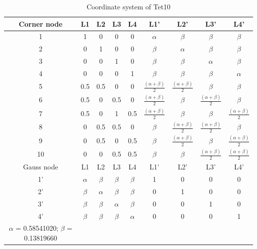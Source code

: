 \begin{table}
	\centering
	\caption{Coordinate system of Tet10} \label{tab: Tet10}
	\begin{tabular}{ccccccccc}			
		\hline
		Corner node\centering& L1& L2& L3& L4& L1'& L2'& L3'& L4'\\ \hline
		1\centering& 1& 0& 0& 0& $\alpha$& $\beta$& $\beta$& $\beta$\\
		2\centering& 0& 1& 0& 0& $\beta$& $\alpha$& $\beta$& $\beta$\\
		3\centering& 0& 0& 1& 0& $\beta$& $\beta$& $\alpha$& $\beta$\\
		4\centering& 0& 0& 0& 1& $\beta$& $\beta$& $\beta$& $\alpha$\\
		5\centering& 0.5& 0.5& 0& 0& $\frac{(\alpha+\beta)}{2}$& $\frac{(\alpha+\beta)}{2}$& $\beta$& $\beta$\\
		6\centering& 0.5& 0& 0.5& 0& $\frac{(\alpha+\beta)}{2}$& $\beta$& $\frac{(\alpha+\beta)}{2}$& $\beta$\\
		7\centering& 0.5& 0& 1& 0.5& $\frac{(\alpha+\beta)}{2}$& $\beta$& $\beta$& $\frac{(\alpha+\beta)}{2}$\\
		8\centering& 0& 0.5& 0.5& 0& $\beta$& $\frac{(\alpha+\beta)}{2}$& $\frac{(\alpha+\beta)}{2}$& $\beta$\\
		9\centering& 0& 0.5& 0& 0.5& $\beta$& $\frac{(\alpha+\beta)}{2}$& $\beta$& $\frac{(\alpha+\beta)}{2}$\\
		10\centering& 0& 0& 0.5& 0.5& $\beta$& $\beta$& $\frac{(\alpha+\beta)}{2}$& $\frac{(\alpha+\beta)}{2}$\\
		\hline
		Gauss node\centering& L1& L2& L3& L4& L1'& L2'& L3'& L4' \\ \hline
		1'\centering& $\alpha$& $\beta$& $\beta$& $\beta$& 1& 0& 0& 0  \\
		2'\centering&$\beta$ & $\alpha$& $\beta$& $\beta$& 0& 1& 0& 0 \\
		3'\centering& $\beta$& $\beta$& $\alpha$& $\beta$& 0& 0& 1& 0\\
		4'\centering& $\beta$& $\beta$& $\beta$& $\alpha$& 0& 0& 0& 1\\
		\hline
		$\alpha$ = 0.58541020; $\beta$ = 0.13819660&&&&&&&&\\
		\hline 		    
	\end{tabular}	
\end{table}		

